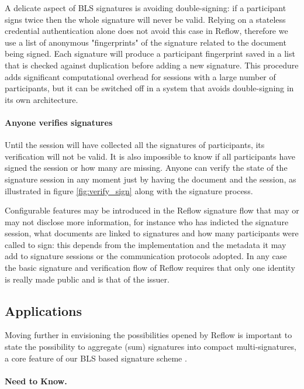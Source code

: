 \documentclass[twocolumn]{article}
\begin{document}
A delicate aspect of BLS signatures is avoiding double-signing: if a
participant signs twice then the whole signature will never be valid.
Relying on a stateless credential authentication alone does not avoid
this case in Reflow, therefore we use a list of anonymous
"fingerprints" of the signature related to the document being signed.
Each signature will produce a participant fingerprint saved in a list
that is checked against duplication before adding a new
signature. This procedure adds significant computational overhead for
sessions with a large number of participants, but it can be switched
off in a system that avoids double-signing in its own architecture.

\paragraph*{Anyone verifies signatures}

Until the session will have collected all the signatures of
participants, its verification will not be valid. It is also
impossible to know if all participants have signed the session or how
many are missing. Anyone can verify the state of the signature session
in any moment just by having the document and the session, as
illustrated in figure \ref{fig:verify_sign} along with the signature
process.

Configurable features may be introduced in the Reflow signature
flow that may or may not disclose more information, for instance who
has indicted the signature session, what documents are linked to
signatures and how many participants were called to sign: this depends
from the implementation and the metadata it may add to signature
sessions or the communication protocols adopted.  In any case the
basic signature and verification flow of Reflow requires that
only one identity is really made public and is that of the issuer.

\subsection*{Applications}

Moving further in envisioning the possibilities opened by Reflow
is important to state the possibility to aggregate (sum) signatures into
compact multi-signatures, a core feature of our BLS based signature
scheme \citep{compact-multisig}.

\paragraph*{Need to Know.}
\end{document}

